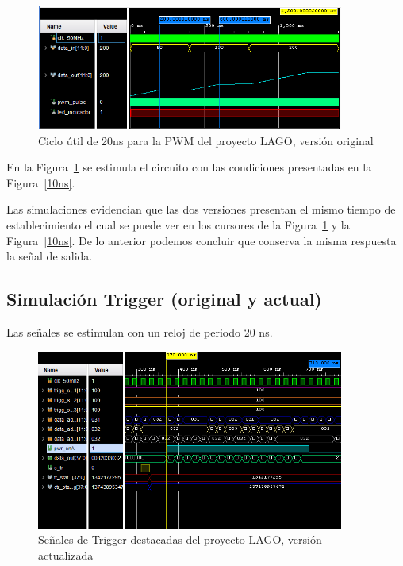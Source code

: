 \begin{figure}[H]
 \centering
 \includegraphics[width=0.9\textwidth]{Figs/Rampa_50MHz.PNG}
 \caption{Ciclo útil de 20ns para la PWM del proyecto LAGO, versión original}
 \label{ramapa50}
\end{figure}

En la Figura~\ref{ramapa50} se estimula el circuito con las condiciones presentadas en la Figura~\ref{10ns}.

Las simulaciones evidencian que las dos versiones presentan el mismo tiempo de establecimiento el cual se puede ver en los cursores de la Figura~\ref{ramapa50} y la Figura~\ref{10ns}. De lo anterior podemos concluir que conserva la misma respuesta la señal de salida.



\subsection{Simulación Trigger (original y actual)}
Las señales se estimulan con un reloj de periodo 20 ns.

\begin{figure}[H]
\centering
\includegraphics[width=0.9\textwidth]{Figs/trigernevo.PNG} 
\caption{Señales de Trigger destacadas del proyecto LAGO, versión actualizada}
\label{tigeer}
\end{figure}

